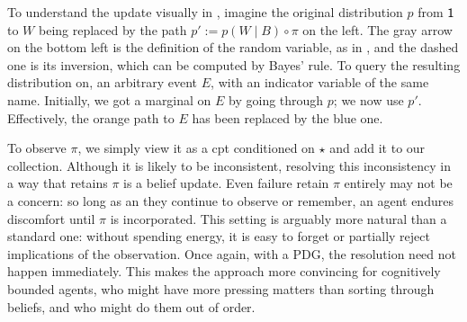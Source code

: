 \documentclass{article}
\newcommand{\MN}{PDG}
\numberwithin{equation}{section}
\begin{document}
	To understand the update visually in , imagine the original distribution $p$ from $\sf 1$ to $W$ being replaced by the path $p' := p(W \mid B) \circ \pi$  on the left. The gray arrow on the bottom left is the definition of the random variable, as in , and the dashed one is its inversion, which can be computed by Bayes' rule.  %
	To query the resulting distribution on, an arbitrary event $E$, with an indicator variable of the same name. Initially, we got a marginal on $E$ by going through $p$; we now use $p'$. Effectively, the orange path to $E$ has been replaced by the blue one.

	
	To observe $\pi$, we simply view it as a cpt conditioned on $\star$ and add it to our collection. 
	Although it is likely to be inconsistent, resolving this inconsistency in a way that retains $\pi$ is a belief update. 
	Even failure retain $\pi$ entirely may not be a concern: so long as an they continue to observe or remember, an agent endures discomfort until $\pi$ is incorporated. This setting is arguably more natural than a standard one: without spending energy, it is easy to forget or partially reject implications of the observation.	
	Once again, with a \MN, the resolution need not happen immediately. This makes the approach more convincing for cognitively bounded agents, who might have more pressing matters than sorting through beliefs, and who might do them out of order.
\end{document}
